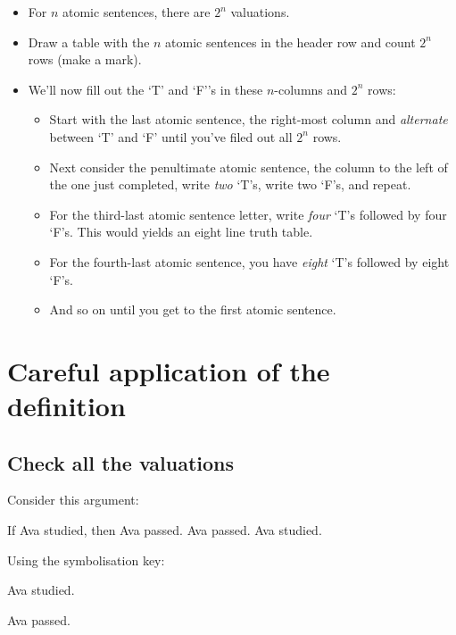 \begin{itemize}
	\item 	For $n$ atomic sentences, there are $2^n$ valuations. 
	
	\item Draw a table with the $n$ atomic sentences in the header row and count $2^n$ rows (make a mark). 
	
	\item We'll now fill out the `T' and `F''s in these $n$-columns and $2^n$ rows:
\begin{itemize}
	 \item	Start with the last atomic sentence, the right-most column and \emph{alternate} between `T’ and `F’ until you've filed out all $2^n$ rows. 
	
\item	Next consider the penultimate atomic sentence, the column to the left of the one just completed,  write \emph{two} ‘T’s, write two ‘F’s,
	and repeat. 
	
\item	For the third-last atomic sentence letter, write \emph{four} ‘T’s followed
	by four ‘F’s. This would yields an eight line truth table. 
	
\item	For the fourth-last atomic sentence, you have \emph{eight} ‘T’s followed by eight ‘F’s. 
	
\item	And so on until you get to the first atomic sentence.
\end{itemize}
\end{itemize}

\section{Careful application of the definition}
\subsection{Check all the valuations}
Consider this argument:
\begin{earg}
	\prem If Ava studied, then Ava passed.
	\prem Ava passed.
	\conc Ava studied.
\end{earg}

Using the symbolisation key:
\begin{ekey}
	\item[S] Ava studied.
	\item[P] Ava passed.
\end{ekey}

